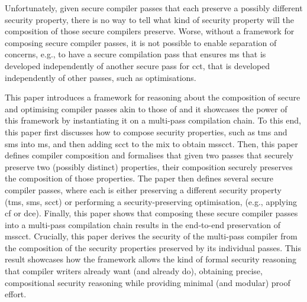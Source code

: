 \documentclass[dvipsnames,conference]{IEEEtran}
\theoremstyle{definition}
\begin{document}

Unfortunately, given secure compiler passes that each preserve a possibly different security property, there is no way to tell what kind of security property will the composition of those secure compilers preserve.
Worse, without a framework for composing secure compiler passes, it is not possible to enable separation of concerns, e.g., to have a secure compilation pass that ensures \gls*{ms} that is developed independently of another secure pass for \gls*{cct}, that is developed independently of other passes, such as optimisations.


This paper introduces a framework for reasoning about the composition of secure and optimising compiler passes akin to those of  and it showcases the power of this framework by instantiating it on a multi-pass compilation chain.
To this end, this paper first discusses how to compose security properties, such as \gls*{tms} and \gls*{sms} into \gls*{ms}, and then adding \gls*{scct} to the mix to obtain \gls*{msscct}.
Then, this paper defines compiler composition and formalises that given two passes that securely preserve two (possibly distinct) properties, their composition securely preserves the composition of those properties.
The paper then defines several secure compiler passes, where each is either preserving a different security property (\gls*{tms}, \gls*{sms}, \gls*{scct}) or performing a security-preserving optimisation, (e.g., applying \gls*{cf} or \gls*{dce}).
Finally, this paper shows that composing these secure compiler passes into a multi-pass compilation chain results in the end-to-end preservation of \gls*{msscct}.
Crucially, this paper derives the security of the multi-pass compiler from the composition of the security properties preserved by its individual passes.
This result showcases how the framework allows the kind of formal security reasoning that compiler writers already want (and already do), obtaining precise, compositional security reasoning while providing minimal (and modular) proof effort.
\end{document}
